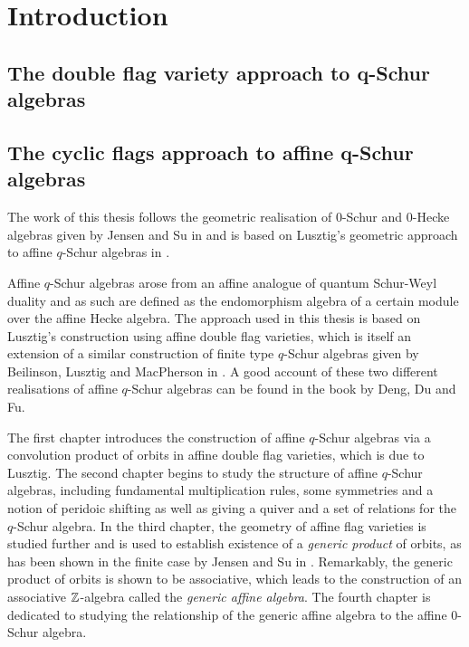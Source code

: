 \documentclass[a4paper, 11pt]{report}
\begin{document}
\maketitle
\tableofcontents

\chapter{Introduction}

\section{The double flag variety approach to q-Schur algebras}

\section{The cyclic flags approach to affine q-Schur algebras}

The work of this thesis follows the geometric realisation of $0$-Schur and $0$-Hecke algebras given by Jensen and Su in \cite{su12} and is based on Lusztig's geometric approach to affine $q$-Schur algebras in \cite{lusztig99}.

Affine $q$-Schur algebras arose from an affine analogue of quantum Schur-Weyl duality and as such are defined as the endomorphism algebra of a certain module over the affine Hecke algebra. The approach used in this thesis is based on Lusztig's construction using affine double flag varieties, which is itself an extension of a similar construction of finite type $q$-Schur algebras given by Beilinson, Lusztig and MacPherson in \cite{blm90}. A good account of these two different realisations of affine $q$-Schur algebras can be found in the book \cite{deng12} by Deng, Du and Fu.

The first chapter introduces the construction of affine $q$-Schur algebras via a convolution product of orbits in affine double flag varieties, which is due to Lusztig. The second chapter begins to study the structure of affine $q$-Schur algebras, including fundamental multiplication rules, some symmetries and a notion of peridoic shifting as well as giving a quiver and a set of relations for the $q$-Schur algebra. In the third chapter, the geometry of affine flag varieties is studied further and is used to establish existence of a \emph{generic product} of orbits, as has been shown in the finite case by Jensen and Su in \cite{su12}. Remarkably, the generic product of orbits is shown to be associative, which leads to the construction of an associative $\mathbb{Z}$-algebra called the \emph{generic affine algebra}. The fourth chapter is dedicated to studying the relationship of the generic affine algebra to the affine $0$-Schur algebra.
\end{document}

